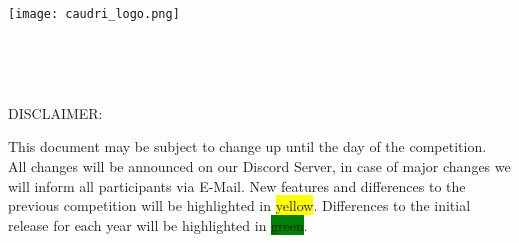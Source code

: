 \documentclass{caudri_report}
\begin{document}
\begin{titlepage}
	\makeatletter
	\begin{center}
		\vspace*{3cm}

		\texttt{[image: caudri\_logo.png]}\\
		\vspace{1cm}

		\Huge\bfseries\@title\\
		\vspace{\baselineskip}

		\Large\@date\\
		\vfill

		\large DISCLAIMER:\\

		{\raggedright This document may be subject to change up until the day of the competition.\\
		All changes will be announced on our Discord Server, in case of major changes we will inform all participants via E-Mail.
		New features and differences to the previous competition will be highlighted in \colorbox{yellow}{yellow}.
		Differences to the initial release for each year will be highlighted in \colorbox{green}{green}.\\}

	\end{center}
	\makeatother
\end{titlepage}

\tableofcontents









\end{document}
